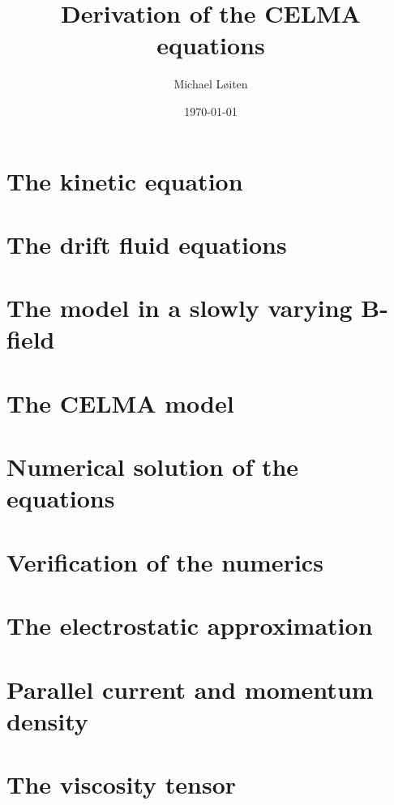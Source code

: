 \documentclass[12pt,a4paper,oneside,openright]{report} %
\title{\vspace{-8ex}Derivation of the CELMA equations\vspace{-1ex}}
\author{Michael L{\o}iten}
\date{\vspace{-2ex}\today}
\begin{document}
\maketitle
%
\chapter{The kinetic equation}

%
\chapter{The drift fluid equations}
\label{chap:drift-order}


\chapter{The model in a slowly varying B-field}


\chapter{The CELMA model}






\chapter{Numerical solution of the equations}


\chapter{Verification of the numerics}
\label{app:verification}


\appendix

\chapter{The electrostatic approximation}
\label{app:elstat}


\chapter{Parallel current and momentum density}
\label{app:currentMomentum}


\chapter{The viscosity tensor}
\label{app:piTensor}

\end{document}
